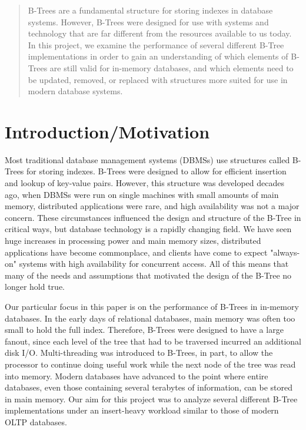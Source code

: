 \documentclass{sig-alternate}
\begin{document}
\date{11 December 2015}

\maketitle
\begin{abstract}
B-Trees are a fundamental structure for storing indexes in database systems. However, B-Trees were designed for use with systems and technology that are far different from the resources available to us today. In this project, we examine the performance of several different B-Tree implementations in order to gain an understanding of which elements of B-Trees are still valid for in-memory databases, and which elements need to be updated, removed, or replaced with structures more suited for use in modern database systems.
\end{abstract}

%
%



\section{Introduction/Motivation}
Most traditional database management systems (DBMSs) use structures called B-Trees for storing indexes. B-Trees were designed to allow for efficient insertion and lookup of key-value pairs. However, this structure was developed decades ago, when DBMSs were run on single machines with small amounts of main memory, distributed applications were rare, and high availability was not a major concern. These circumstances influenced the design and structure of the B-Tree in critical ways, but database technology is a rapidly changing field. We have seen huge increases in processing power and main memory sizes, distributed applications have become commonplace, and clients have come to expect "always-on" systems with high availability for concurrent access. All of this means that many of the needs and assumptions that motivated the design of the B-Tree no longer hold true. 

Our particular focus in this paper is on the performance of B-Trees in in-memory databases. In the early days of relational databases, main memory was often too small to hold the full index. Therefore, B-Trees were designed to have a large fanout, since each level of the tree that had to be traversed incurred an additional disk I/O. Multi-threading was introduced to B-Trees, in part, to allow the processor to continue doing useful work while the next node of the tree was read into memory. Modern databases have advanced to the point where entire databases, even those containing several terabytes of information, can be stored in main memory. Our aim for this project was to analyze several different B-Tree implementations under an insert-heavy workload similar to those of modern OLTP databases.
\end{document}
